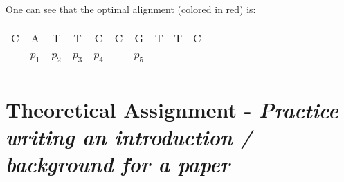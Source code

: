 \documentclass[%
   10pt,              %
   nenglish,           %
   a4paper,           %
   DIV11,             %
]{scrartcl}%
\begin{document}
\noindent One can see that the optimal alignment (colored in red) is:

\begin{table}[h]
\centering
\begin{tabular}{cccccccccc}
 C&A&T&T&C&C&G&T&T&C\\
  &$p_1$&$p_2$&$p_3$&$p_4$&-&$p_5$& & & 
\end{tabular}
\end{table}


\section*{Theoretical Assignment - \textsl{Practice writing an introduction / background for a paper}}

%
%
 
\end{document}
